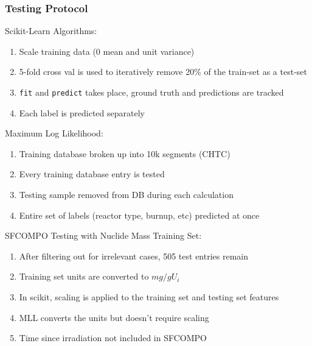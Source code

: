 
\begin{frame}
  \frametitle{Testing Protocol}
  \begin{adjustwidth}{-15pt}{0pt}
  \vspace{-5pt}
  \begin{block}{Scikit-Learn Algorithms:}
    \begin{enumerate}
      \itemsep 0.2em 
      \footnotesize
      \item Scale training data ($0$ mean and unit variance)
      \item 5-fold cross val is used to iteratively remove 20\% of the train-set as a test-set
      \item \texttt{fit} and \texttt{predict} takes place, ground truth and predictions are tracked
      \item Each label is predicted separately
    \end{enumerate}
  \end{block}
  \vspace{-5pt}
  \begin{block}{Maximum Log Likelihood:}
    \begin{enumerate}
      \itemsep 0.2em 
      \footnotesize
      \item Training database broken up into 10k segments (CHTC)
      \item Every training database entry is tested
      \item Testing sample removed from DB during each calculation
      \item Entire set of labels (reactor type, burnup, etc) predicted at once
    \end{enumerate}
  \end{block}
  \vspace{-5pt}
  \begin{block}{SFCOMPO Testing with Nuclide Mass Training Set:}
    \begin{enumerate}
      \itemsep 0.2em 
      \footnotesize
      \item After filtering out for irrelevant cases, 505 test entries remain
      \item Training set units are converted to $mg/gU_i$
      \item In scikit, scaling is applied to the training set and testing set features
      \item MLL converts the units but doesn't require scaling
      \item Time since irradiation not included in SFCOMPO
    \end{enumerate}
  \end{block}
  \end{adjustwidth}
\end{frame}

